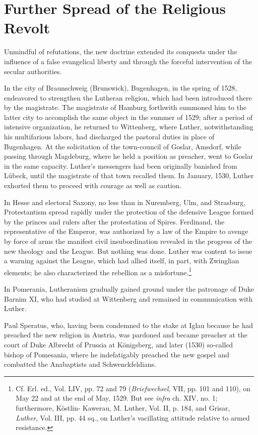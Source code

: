 \section{Further Spread of the Religious Revolt}

Unmindful of refutations, the new doctrine extended its conquests
under the influence of a false evangelical liberty and through the
forceful intervention of the secular authorities.

In the city of Braunschweig (Brunswick), Bugenhagen, in the
spring of 1528, endeavored to strengthen the Lutheran religion,
which had been introduced there by the magistrate. The magistrate
of Hamburg forthwith summoned him to the latter city to accomplish the
same object in the summer of 1529; after a period of intensive
organization, he returned to Wittenberg, where Luther, notwithstanding
his multifarious labors, had discharged the pastoral duties
in place of Bugenhagen. At the solicitation of the town-council of
Goslar, Amsdorf, while passing through Magdeburg, where he held
a position as preacher, went to Goslar in the same capacity. Luther’s
messengers had been originally banished from Lübeck, until the magistrate
of that town recalled them. In January, 1530, Luther exhorted
them to proceed with courage as well as caution.

In Hesse and electoral Saxony, no less than in Nuremberg, Ulm,
and Strasburg, Protestantism spread rapidly under the protection of
the defensive League formed by the princes and rulers after the protestation
of Spires. Ferdinand, the representative of the Emperor,
was authorized by a law of the Empire to avenge by force of arms the
manifest civil insubordination revealed in the progress of the new theology
and the League. But nothing was done. Luther was content to
issue a warning against the League, which had allied itself, in part,
with Zwinglian elements; he also characterized the rebellion as a
misfortune.\footnote
{Cf. Erl. ed., Vol. LIV, pp. 72 and 79 (\textit{Briefwechsel}, VII, pp. 101 and 110), on May
22 and at the end of May, 1529. But see \textit{infra} ch. XIV, no. 1; furthermore, Köstlin-
Kawerau, M. Luther, Vol. II, p. 184, and Grisar, \textit{Luther}, Vol. III, pp. 44 sq., on Luther’s
vacillating attitude relative to armed resistance.}

In Pomerania, Lutheranism gradually gained ground under the
patronage of Duke Barnim XI, who had studied at Wittenberg
and remained in communication with Luther.

Paul Speratus, who, having been condemned to the stake at Iglau
because he had preached the new religion in Austria, was pardoned
and became preacher at the court of Duke Albrecht of Prussia at
Königsberg, and later (1530) so-called bishop of Pomesania, where
he indefatigably preached the new gospel and combatted the Anabaptists
and Schwenckfeldians.


